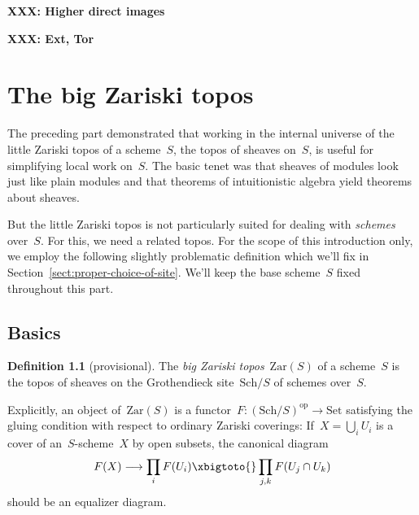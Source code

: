 \documentclass[10pt,reqno,a4paper]{amsbook}
\theoremstyle{definition}
\newtheorem{defn}{Definition}[section]
\theoremstyle{plain}
\theoremstyle{remark}
\newcommand{\Set}{\mathrm{Set}}
\newcommand{\Zar}{\mathrm{Zar}}
\newcommand{\Sch}{\mathrm{Sch}}
\newcommand{\op}{\mathrm{op}}
\newcommand{\?}{\,{:}\,}
\renewcommand{\_}{\mathpunct{.}\,}
\newcommand{\XXX}[1]{\textbf{XXX: #1}}
\begin{document}
\XXX{Higher direct images}

\XXX{Ext, Tor}


\chapter{The big Zariski topos}\label{part:big-zariski}

The preceding part demonstrated that working in the internal universe of
the little Zariski topos of a scheme~$S$, the topos of sheaves on~$S$, is
useful for simplifying local work on~$S$. The basic tenet was that sheaves of
modules look just like plain modules and that theorems of intuitionistic
algebra yield theorems about sheaves.

But the little Zariski topos is not particularly suited for dealing with
\emph{schemes} over~$S$. For this, we need a related topos. For the scope of
this introduction only, we employ the following slightly problematic
definition which we'll fix in Section~\ref{sect:proper-choice-of-site}.
We'll keep the base scheme~$S$ fixed throughout this part.


\section{Basics}

\begin{defn}[provisional]The \emph{big Zariski topos}~$\Zar(S)$ of a scheme~$S$ is the
topos of sheaves on the Grothendieck site~$\Sch/S$ of schemes over~$S$.
\end{defn}

Explicitly, an object of~$\Zar(S)$ is a functor~$F : (\Sch/S)^\op \to \Set$
satisfying the gluing condition with respect to ordinary Zariski coverings:
If~$X = \bigcup_i U_i$ is a cover of an~$S$-scheme~$X$ by open subsets, the
canonical diagram
\[ F(X) \longrightarrow \prod_i F(U_i) \xbigtoto{} \prod_{j,k} F(U_j \cap U_k)
\]
should be an equalizer diagram.
\end{document}
